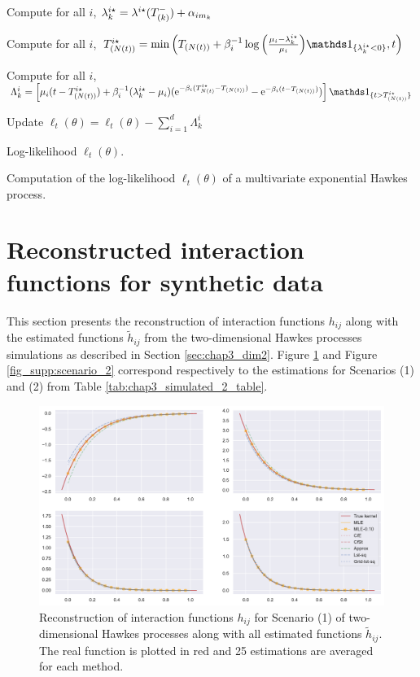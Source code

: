 \begin{subappendices}
\begin{algorithm}[!ht]
{     Compute for all $i$, $\lambda_k^{i\star} = \lambda^{i\star}(T_{(k)}^-) + \alpha_{im_k}$\;
  
     }
     Compute for all $i$, $T\park[N(t)]^{i\star} = \min{\adaptedpar{T\park[N(t)] + \beta_i^{-1}\log{\adaptedpar{\frac{\mu_i - \lambda_k^{i\star}}{\mu_i}}}\II_{\{\lambda_k^{i\star} < 0\}}, t}}$\;
  
     Compute for all $i$, $\Lambda^i_k = \left[\mu_i(t - T\park[N(t)]^{i\star}) + \beta_i^{-1}(\lambda_k^{i\star} - \mu_i)(\mathrm{e}^{-\beta_i(T_{N(t)}^{i\star} - T\park[N(t)])} - \mathrm{e}^{-\beta_i(t- T\park[N(t)])})\right]\II_{\{t > T\park[N(t)]^{i\star}\}}$\;
  
     Update $\ell_t(\theta) =  \ell_t(\theta) - \sum_{i=1}^{d}{\Lambda^i_k}$\;
  
     \Return Log-likelihood $\ell_t(\theta)$.
     \caption{Computation of the log-likelihood $\ell_t(\theta)$ of a multivariate exponential Hawkes process.}
     \label{alg:chap3_likelihood}
    \end{algorithm}
  
  
  \section{Reconstructed interaction functions for synthetic data}
  \label{app:chap3_numerical}
  
  This section presents the reconstruction of interaction functions $h_{ij}$ along with the estimated functions $\tilde h_{ij}$ from the two-dimensional Hawkes processes simulations as described in Section \ref{sec:chap3_dim2}. Figure \ref{fig_supp:scenario_1} and Figure \ref{fig_supp:scenario_2} correspond respectively to the estimations for Scenarios (1) and (2) from Table \ref{tab:chap3_simulated_2_table}.
  
  {\begin{figure}[!ht]
       \centering
       \includegraphics[width=\linewidth]{images/chapter3/reconstruction_param_1.pdf}
       \caption{Reconstruction of interaction functions $h_{ij}$ for Scenario (1) of two-dimensional Hawkes processes along with all estimated functions $\tilde h_{ij}$. The real function is plotted in red and 25 estimations are averaged for each method.}
       \label{fig_supp:scenario_1}
       \end{figure}}
       

\end{subappendices}
